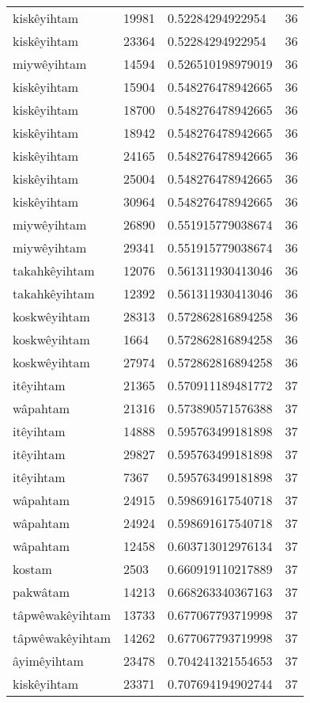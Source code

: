 \begin{longtable}{llll}
kiskêyihtam & 19981 & 0.52284294922954 & 36 \\
kiskêyihtam & 23364 & 0.52284294922954 & 36 \\
miywêyihtam & 14594 & 0.526510198979019 & 36 \\
kiskêyihtam & 15904 & 0.548276478942665 & 36 \\
kiskêyihtam & 18700 & 0.548276478942665 & 36 \\
kiskêyihtam & 18942 & 0.548276478942665 & 36 \\
kiskêyihtam & 24165 & 0.548276478942665 & 36 \\
kiskêyihtam & 25004 & 0.548276478942665 & 36 \\
kiskêyihtam & 30964 & 0.548276478942665 & 36 \\
miywêyihtam & 26890 & 0.551915779038674 & 36 \\
miywêyihtam & 29341 & 0.551915779038674 & 36 \\
takahkêyihtam & 12076 & 0.561311930413046 & 36 \\
takahkêyihtam & 12392 & 0.561311930413046 & 36 \\
koskwêyihtam & 28313 & 0.572862816894258 & 36 \\
koskwêyihtam & 1664 & 0.572862816894258 & 36 \\
koskwêyihtam & 27974 & 0.572862816894258 & 36 \\
itêyihtam & 21365 & 0.570911189481772 & 37 \\
wâpahtam & 21316 & 0.573890571576388 & 37 \\
itêyihtam & 14888 & 0.595763499181898 & 37 \\
itêyihtam & 29827 & 0.595763499181898 & 37 \\
itêyihtam & 7367 & 0.595763499181898 & 37 \\
wâpahtam & 24915 & 0.598691617540718 & 37 \\
wâpahtam & 24924 & 0.598691617540718 & 37 \\
wâpahtam & 12458 & 0.603713012976134 & 37 \\
kostam & 2503 & 0.660919110217889 & 37 \\
pakwâtam & 14213 & 0.668263340367163 & 37 \\
tâpwêwakêyihtam & 13733 & 0.677067793719998 & 37 \\
tâpwêwakêyihtam & 14262 & 0.677067793719998 & 37 \\
âyimêyihtam & 23478 & 0.704241321554653 & 37 \\
kiskêyihtam & 23371 & 0.707694194902744 & 37 \\

\end{longtable}
